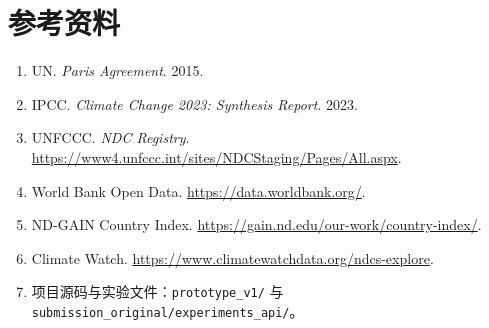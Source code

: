 \documentclass[12pt,a4paper]{ctexart}
\begin{document}
\section*{参考资料}
\begin{enumerate}
  \item UN. \textit{Paris Agreement}. 2015.
  \item IPCC. \textit{Climate Change 2023: Synthesis Report}. 2023.
  \item UNFCCC. \textit{NDC Registry}. \url{https://www4.unfccc.int/sites/NDCStaging/Pages/All.aspx}.
  \item World Bank Open Data. \url{https://data.worldbank.org/}.
  \item ND-GAIN Country Index. \url{https://gain.nd.edu/our-work/country-index/}.
  \item Climate Watch. \url{https://www.climatewatchdata.org/ndcs-explore}.
  \item 项目源码与实验文件：\texttt{prototype\_v1/} 与 \texttt{submission\_original/experiments\_api/}。
\end{enumerate}
\end{document}
